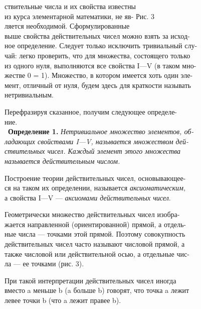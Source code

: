 \documentclass[a5paper]{article}
\begin{document}
{\footnotesize ствительные числа и их свойства известны  \\
из курса элементарной математики, не яв- \hspace{30pt} Рис. 3 \\
ляется необходимой. Сформулированные \\
выше свойства действительных чисел можно взять за исход- \\
ное определение. Следует только исключить тривиальный слу- \\
чай: легко проверить, что для множества, состоящего только \\
из одного нуля, выполняются все свойства I—V (в таком мно- \\
жестве 0 = 1). Множество, в котором имеется хоть один эле- \\
мент, отличный от нуля, будем здесь для краткости называть \\
нетривиальным. \par
Перефразируя сказанное, получим следующее определе- \\
ние. \\
\
\textbf{Определение 1.} \textit{Нетривиальное множество элементов, об- \\
ладающих свойствами I—V, называется множеством дей- \\
ствительных чисел. Каждый элемент этого множества \\
называется действительным числом.} \par
Построение теории действительных чисел, основывающее- \\
ся на таком их определении, называется \textit{аксиоматическим}, \\
а свойства I—V — \textit{аксиомами действительных чисел}. \par
Геометрически множество действительных чисел изобра- \\
жается направленной (ориентированной) прямой, а отдель- \\
ные числа — точками этой прямой. Поэтому совокупность \\
действительных чисел часто называют числовой прямой, а \\
также числовой или действительной осью, а отдельные чис- \\
ла — ее точками (рис. 3). \par
При такой интерпретации действительных чисел иногда \\
вместо a меньше b (a больше b) говорят, что точка a лежит \\
левее точки b (что a лежит правее b). \par
}
\end{document}
